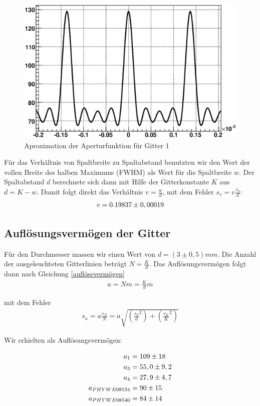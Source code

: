 \documentclass[12pt]{article}
\begin{document}
\begin{figure}[H]  
\centering
\includegraphics[width=0.7\linewidth]{pictures/apertur.eps}
\caption{Aproximation der Aperturfunktion für Gitter 1}
\end{figure}

Für das Verhältnis von Spaltbreite zu Spaltabstand benutzten wir den Wert der vollen Breite des halben Maximums (FWHM) als Wert für die Spaltbreite $w$. Der Spaltabstand $d$ berechnete sich dann mit Hilfe der Gitterkonstante $K$ aus $d= K - w$. Damit folgt direkt das Verhältnis $v=\frac{w}{d}$, mit dem Fehler $s_v=v\frac{s_d}{d}$:
\begin{align}
 \notag
v=0.19837 \pm 0,00019
\end{align}

\subsection{Auflösungsvermögen der Gitter}
Für den Durchmesser massen wir einen Wert von $d=(3 \pm 0,5)mm$. Die Anzahl der ausgeleuchteten Gitterlinien beträgt
$N=\frac{K}{d}$. Das Auflösungsvermögen folgt dann nach Gleichung \ref{auflösevermögen} 
\begin{align}
 a=Nm=\frac{K}{d}m
\end{align}

mit dem Fehler 
\begin{align}
 s_a=a\frac{s_N}{N}=a\sqrt{\left( \frac{s_d}{d}^2 \right) + \left( \frac{s_K}{K}^2 \right) }
\end{align}

Wir erhielten als Auflösungsvermögen:

\begin{align}
 \notag
a_1 &=  109 \pm  18\\
 \notag
a_3 &=  55,0 \pm  9,2\\
 \notag
a_4 &=  27,9 \pm  4,7\\
 \notag
a_{PHYWE08534} &= 90 \pm 15\\
 \notag
a_{PHYWE08540} &= 84 \pm 14
\end{align}
\end{document}
